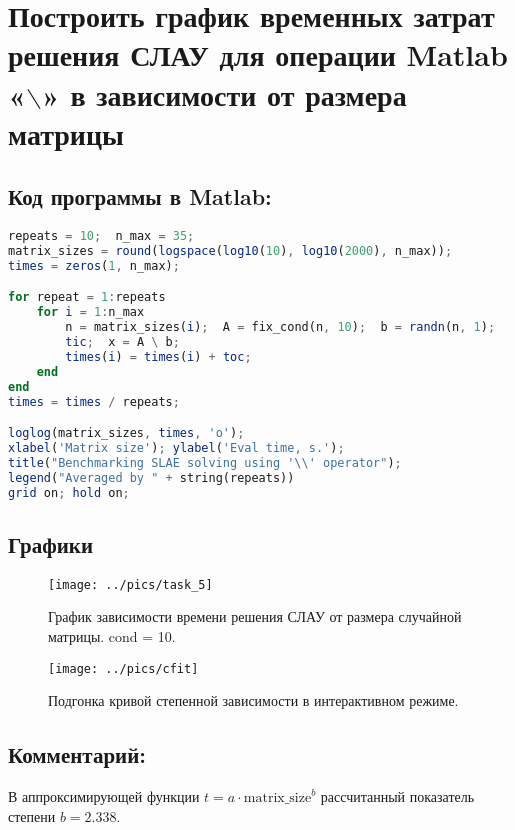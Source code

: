 \clearpage
\section{Построить график временных затрат решения СЛАУ для операции Matlab «$\backslash$» в зависимости от размера матрицы}
\subsection{Код программы в Matlab:}
\begin{lstlisting}[language=octave]
repeats = 10;  n_max = 35;
matrix_sizes = round(logspace(log10(10), log10(2000), n_max));
times = zeros(1, n_max);

for repeat = 1:repeats
    for i = 1:n_max
        n = matrix_sizes(i);  A = fix_cond(n, 10);  b = randn(n, 1);
        tic;  x = A \ b;
        times(i) = times(i) + toc;
    end
end
times = times / repeats;

loglog(matrix_sizes, times, 'o');
xlabel('Matrix size'); ylabel('Eval time, s.');
title("Benchmarking SLAE solving using '\\' operator");
legend("Averaged by " + string(repeats))
grid on; hold on;
\end{lstlisting}
\subsection{Графики}
\begin{figure}[H]
    \centering
    \caption{График зависимости времени решения СЛАУ от размера случайной матрицы. cond = 10.}
    \texttt{[image: ../pics/task\_5]}
    \label{pic:1}
\end{figure}
\begin{figure}[H]
    \centering
    \caption{Подгонка кривой степенной зависимости в интерактивном режиме.}
    \texttt{[image: ../pics/cfit]}
    \label{pic:2}
\end{figure}
\subsection{Комментарий:}
В аппроксимирующей функции $t=a\cdot \text{matrix\_size}^b$ рассчитанный показатель степени $b=2.338$.

